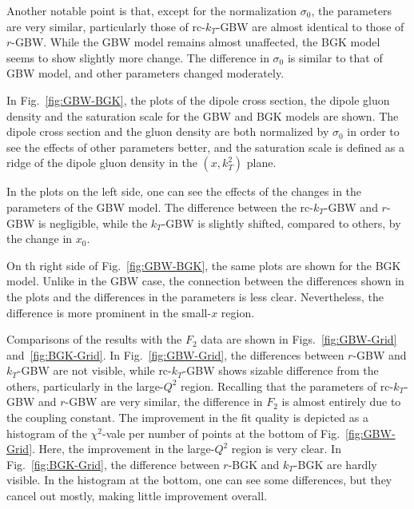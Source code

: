 \documentclass[11pt]{article}
\begin{document}
Another notable point is that, except for the normalization $\sigma_0$, the parameters are very similar, particularly those of rc-$k_T$-GBW are almost identical to those of $r$-GBW. 
While the GBW model remains almost unaffected, the BGK model seems to show slightly more change. The difference in $\sigma_0$ is similar to that of GBW model, and other parameters changed moderately.

In Fig.~\ref{fig:GBW-BGK}, the plots of the dipole cross section, the dipole
gluon density and the saturation scale for the GBW and BGK models are shown. The
dipole cross section and the gluon density are both normalized by $\sigma_0$ in
order to see the effects  of other parameters better, and the saturation scale
is defined as a ridge of the dipole gluon density in the $(x,k_T^2)$ plane.

In the plots on the left side, one can see the effects of the changes in the
parameters of the GBW model. The difference between the rc-$k_T$-GBW and $r$-GBW
is negligible, while the $k_T$-GBW is slightly shifted, compared to others, by the change in $x_0$.

On th right side of Fig.~\ref{fig:GBW-BGK}, the same plots are shown for the BGK
model. Unlike in the GBW case, the connection between the differences shown in
the plots and the differences in the parameters is less clear. Nevertheless, the
difference is more prominent in the small-$x$ region.

Comparisons of the results with the $F_2$ data are shown in
Figs.~\ref{fig:GBW-Grid} and~\ref{fig:BGK-Grid}.  In Fig.~\ref{fig:GBW-Grid},
the differences between $r$-GBW and $k_T$-GBW are not visible, while
rc-$k_T$-GBW shows sizable difference from the others, particularly in the
large-$Q^2$ region.  Recalling that the parameters of rc-$k_T$-GBW and $r$-GBW
are very similar, the difference in $F_2$ is almost entirely due to the coupling
constant. The improvement in the fit quality is depicted as a histogram of the
$\chi^2$-vale per number of points at the bottom of Fig.~\ref{fig:GBW-Grid}.
Here, the improvement in the large-$Q^2$ region is very clear.  In
Fig.~\ref{fig:BGK-Grid}, the difference between $r$-BGK and $k_T$-BGK are hardly
visible. In the histogram at the bottom, one can see some differences, but they
cancel out mostly, making little improvement overall.
\end{document}
